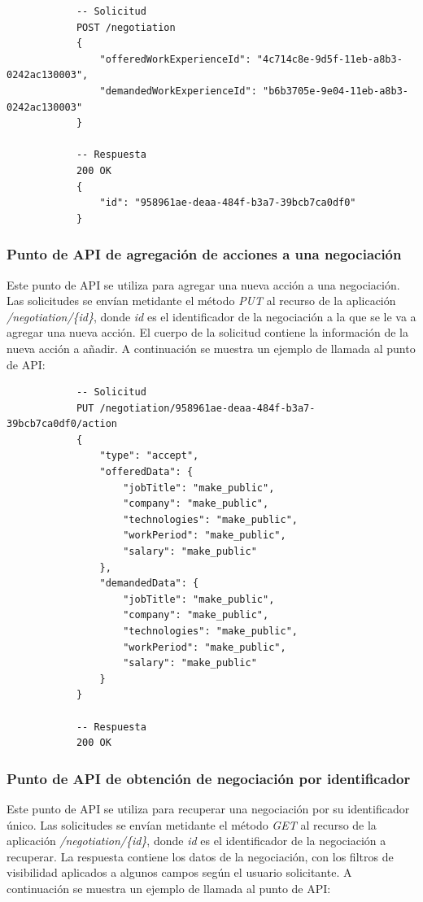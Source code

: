 \documentclass[a4paper, 12pt]{book}
\begin{document}
			{\footnotesize
			\begin{verbatim}
			-- Solicitud
			POST /negotiation
			{
			    "offeredWorkExperienceId": "4c714c8e-9d5f-11eb-a8b3-0242ac130003",
			    "demandedWorkExperienceId": "b6b3705e-9e04-11eb-a8b3-0242ac130003"
			}

			-- Respuesta
			200 OK
			{
			    "id": "958961ae-deaa-484f-b3a7-39bcb7ca0df0"
			}
			\end{verbatim}
			}

\subsubsection{Punto de API de agregación de acciones a una negociación}
\label{subsec:put_negotiation}
Este punto de API se utiliza para agregar una nueva acción a una negociación.
Las solicitudes se envían metidante el método \emph{PUT} al recurso de la aplicación \emph{/negotiation/\{id\}}, donde \emph{id} es el identificador de la negociación a la que se le va a agregar una nueva acción.
El cuerpo de la solicitud contiene la información de la nueva acción a añadir.
A continuación se muestra un ejemplo de llamada al punto de API:

			{\footnotesize
			\begin{verbatim}
			-- Solicitud
			PUT /negotiation/958961ae-deaa-484f-b3a7-39bcb7ca0df0/action
			{
			    "type": "accept",
			    "offeredData": {
			        "jobTitle": "make_public",
			        "company": "make_public",
			        "technologies": "make_public",
			        "workPeriod": "make_public",
			        "salary": "make_public"
			    },
			    "demandedData": {
			        "jobTitle": "make_public",
			        "company": "make_public",
			        "technologies": "make_public",
			        "workPeriod": "make_public",
			        "salary": "make_public"
			    }
			}

			-- Respuesta
			200 OK
			\end{verbatim}
			}



\subsubsection{Punto de API de obtención de negociación por identificador}
\label{subsec:get_negotiation_id}
Este punto de API se utiliza para recuperar una negociación por su identificador único.
Las solicitudes se envían metidante el método \emph{GET} al recurso de la aplicación \emph{/negotiation/\{id\}}, donde \emph{id} es el identificador de la negociación a recuperar.
La respuesta contiene los datos de la negociación, con los filtros de visibilidad aplicados a algunos campos según el usuario solicitante.
A continuación se muestra un ejemplo de llamada al punto de API:
\end{document}
